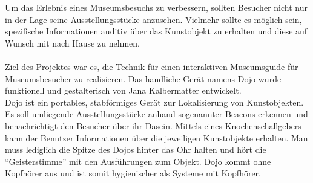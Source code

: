 Um das Erlebnis eines Museumsbesuchs zu verbessern, sollten Besucher nicht nur in der Lage seine Ausstellungsstücke anzusehen. Vielmehr sollte es möglich sein, spezifische Informationen auditiv über das Kunstobjekt zu erhalten und diese auf Wunsch mit nach Hause zu nehmen.\\\\
Ziel des Projektes war es, die Technik für einen interaktiven Museumsguide für Museumsbesucher zu realisieren. Das handliche Gerät namens Dojo wurde funktionell und gestalterisch von Jana Kalbermatter entwickelt.  \\
Dojo ist ein portables, stabförmiges Gerät zur Lokalisierung von Kunstobjekten. Es soll umliegende Ausstellungsstücke anhand sogenannter Beacons erkennen und benachrichtigt den Besucher über ihr Dasein. Mittels eines Knochenschallgebers kann der Benutzer Informationen über die jeweiligen Kunstobjekte erhalten. Man muss lediglich die Spitze des Dojos hinter das Ohr halten und hört die ``Geisterstimme'' mit den Ausführungen zum Objekt. Dojo kommt ohne Kopfhörer aus und ist somit hygienischer als Systeme mit Kopfhörer.

